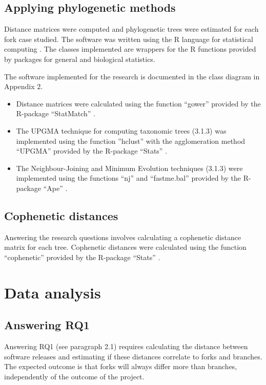\subsection{Applying phylogenetic methods}
Distance matrices were computed and phylogenetic trees were estimated for each fork case studied. The software was written using the R language for statistical computing \citep{RDevelopmentCoreTeam2008a}. The classes implemented are wrappers for the R functions provided by packages for general and biological statistics. 

The software implemented for the research is documented in the class diagram in Appendix 2.

\begin{itemize}
\item{Distance matrices were calculated using the function “gower” provided by the R-package “StatMatch” \citep{DOrazio2016}.}

\item{The UPGMA technique for computing taxonomic trees (3.1.3) was implemented using the function ”hclust” with the agglomeration method “UPGMA” provided by the R-package “Stats” \citep[p.1355]{RDevelopmentCoreTeam2008a}.}

\item{The Neighbour-Joining and Minimum Evolution techniques (3.1.3) were implemented using the functions “nj” and “fastme.bal” provided by the R-package “Ape” \citep{Paradis2004a}.}
\end{itemize}

\subsection{Cophenetic distances}
Answering the research questions involves calculating a cophenetic distance matrix for each tree. Cophenetic distances were calculated using the function “cophenetic” provided by the R-package “Stats” \citep[p.1275]{RDevelopmentCoreTeam2008a}.


\section{Data analysis}

\subsection{Answering RQ1}
Answering RQ1 (see paragraph 2.1) requires calculating the distance between software releases and estimating if these distances correlate to forks and branches. The expected outcome is that forks will always differ more than branches, independently of the outcome of the project.

